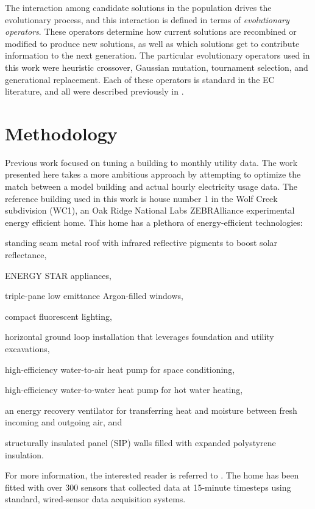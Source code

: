 \documentclass[preprint, review, 12pt]{elsarticle}
\begin{document}
The interaction among candidate solutions in the population drives the evolutionary process, and this interaction is defined in terms of \emph{evolutionary operators}. These operators determine how current solutions are recombined or modified to produce new solutions, as well as which solutions get to contribute information to the next generation. The particular evolutionary operators used in this work were heuristic crossover, Gaussian mutation, tournament selection, and generational replacement. Each of these operators is standard in the EC literature, and all were described previously in \cite{cit:garrett2013}.


\section{Methodology}
\label{sec:methodology}
Previous work \cite{cit:garrett2013} focused on tuning a building to monthly utility data. The work presented here takes a more ambitious approach by attempting to optimize the match between a model building and actual hourly electricity usage data. The reference building used in this work is house number 1 in the Wolf Creek subdivision (WC1), an Oak Ridge National Labs ZEBRAlliance experimental energy efficient home. This home has a plethora of energy-efficient technologies: 
\begin{inparaenum}[(1)]
\item standing seam metal roof with infrared reflective pigments to boost solar reflectance,
\item ENERGY STAR appliances, 
\item triple-pane low emittance Argon-filled windows, 
\item compact fluorescent lighting, 
\item horizontal ground loop installation that leverages foundation and utility excavations, 
\item high-efficiency water-to-air heat pump for space conditioning, 
\item high-efficiency water-to-water heat pump for hot water heating, 
\item an energy recovery ventilator for transferring heat and moisture between fresh incoming and outgoing air, and 
\item structurally insulated panel (SIP) walls filled with expanded polystyrene insulation.
\end{inparaenum}
For more information, the interested reader is referred to \cite{cit:miller2012,cit:biswas2012}. The home has been fitted with over 300 sensors that collected data at 15-minute timesteps using standard, wired-sensor data acquisition systems.
\end{document}
